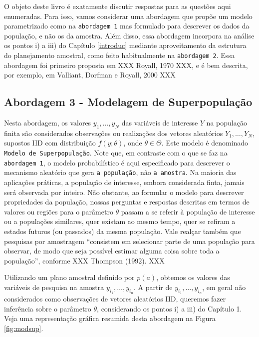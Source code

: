 \documentclass[]{book}
\theoremstyle{definition}
\theoremstyle{definition}
\theoremstyle{definition}
\theoremstyle{remark}
\begin{document}
O objeto deste livro é exatamente discutir respostas para as questões
aqui enumeradas. Para isso, vamos considerar uma abordagem que propõe um
modelo parametrizado como na \texttt{abordagem\ 1} mas formulado para
descrever os dados da população, e não os da amostra. Além disso, essa
abordagem incorpora na análise os pontos i) a iii) do Capítulo
\ref{introduc} mediante aproveitamento da estrutura do planejamento
amostral, como feito habitualmente na \texttt{abordagem\ 2}. Essa
abordagem foi primeiro proposta em XXX Royall, 1970 XXX, e é bem
descrita, por exemplo, em Valliant, Dorfman e Royall, 2000 XXX

\subsection{Abordagem 3 - Modelagem de
Superpopulação}\label{modelsuperpop}

Nesta abordagem, os valores \(y_{1}, \ldots ,y_{N}\) das variáveis de
interesse \(Y\) na população finita são considerados observações ou
realizações dos vetores aleatórios \(Y_{1}, \ldots , Y_{N}\), supostos
IID com distribuição \(f(y;\theta)\), onde \(\theta \in \Theta\). Este
modelo é denominado \texttt{Modelo\ de\ Superpopulação}. Note que, em
contraste com o que se faz na \texttt{abordagem\ 1}, o modelo
probabilístico é aqui especificado para descrever o mecanismo aleatório
que gera \texttt{a\ população}, não \texttt{a\ amostra}. Na maioria das
aplicações práticas, a população de interesse, embora considerada finta,
jamais será observada por inteiro. Não obstante, ao formular o modelo
para descrever propriedades da população, nossas perguntas e respostas
descritas em termos de valores ou regiões para o parâmetro \(\theta\)
passam a se referir à população de interesse ou a populações similares,
quer existam ao mesmo tempo, quer se refiram a estados futuros (ou
passados) da mesma população. Vale realçar também que pesquisas por
amostragem ``consistem em selecionar parte de uma população para
observar, de modo que seja possível estimar alguma coisa sobre toda a
população'', conforme XXX Thompson (1992). XXX

Utilizando um plano amostral definido por \(p(a)\), obtemos os valores
das variáveis de pesquisa na amostra \(y_{i_1}, \ldots , y_{i_n}\). A
partir de \(y_{i_1}, \ldots , y_{i_n}\), em geral não considerados como
observações de vetores aleatórios IID, queremos fazer inferência sobre o
parâmetro \(\theta\), considerando os pontos i) a iii) do Capítulo 1.
Veja uma representação gráfica resumida desta abordagem na Figura
\ref{fig:modsup}.
\end{document}
